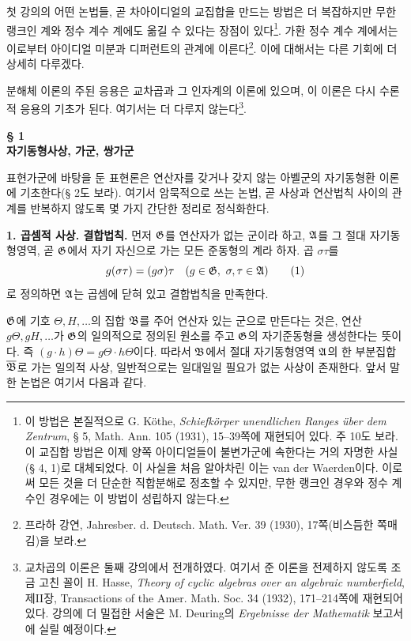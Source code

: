 첫 강의의 어떤 논법들, 곧 차아이디얼의 교집합을 만드는 방법은 더 복잡하지만 무한 랭크인 계와 정수 계수 계에도 옮길 수 있다는 장점이 있다\footnote{이 방법은 본질적으로 G. Köthe, \emph{Schiefkörper unendlichen Ranges über dem Zentrum}, § 5, Math. Ann. 105 (1931), 15--39쪽에 재현되어 있다. 주 10도 보라. 이 교집합 방법은 이제 양쪽 아이디얼들이 불변가군에 속한다는 거의 자명한 사실(§ 4, 1)로 대체되었다. 이 사실을 처음 알아차린 이는 van der Waerden이다. 이로써 모든 것을 더 단순한 직합분해로 정초할 수 있지만, 무한 랭크인 경우와 정수 계수인 경우에는 이 방법이 성립하지 않는다.}. 가환 정수 계수 계에서는 이로부터 아이디얼 미분과 디퍼런트의 관계에 이른다\footnote{프라하 강연, Jahresber. d. Deutsch. Math. Ver. 39 (1930), 17쪽(비스듬한 쪽매김)을 보라.}. 이에 대해서는 다른 기회에 더 상세히 다루겠다.

분해체 이론의 주된 응용은 교차곱과 그 인자계의 이론에 있으며, 이 이론은 다시 수론적 응용의 기초가 된다. 여기서는 더 다루지 않는다\footnote{교차곱의 이론은 둘째 강의에서 전개하였다. 여기서 준 이론을 전제하지 않도록 조금 고친 꼴이 H. Hasse, \emph{Theory of cyclic algebras over an algebraic numberfield}, 제II장, Transactions of the Amer. Math. Soc. 34 (1932), 171--214쪽에 재현되어 있다. 강의에 더 밀접한 서술은 M. Deuring의 \emph{Ergebnisse der Mathematik} 보고서에 실릴 예정이다.}.

\begin{center}
\textbf{§ 1}\\[0.4em]
\textbf{자기동형사상, 가군, 쌍가군}
\end{center}

표현가군에 바탕을 둔 표현론은 연산자를 갖거나 갖지 않는 아벨군의 자기동형환 이론에 기초한다(§ 2도 보라). 여기서 암묵적으로 쓰는 논법, 곧 사상과 연산법칙 사이의 관계를 반복하지 않도록 몇 가지 간단한 정리로 정식화한다.

\noindent\textbf{1. 곱셈적 사상. 결합법칙.} 먼저 \(\mathfrak G\)를 연산자가 없는 군이라 하고, \(\mathfrak A\)를 그 절대 자기동형영역, 곧 \(\mathfrak G\)에서 자기 자신으로 가는 모든 준동형의 계라 하자. 곱 \(\sigma\tau\)를
\[
g(\sigma\tau)=(g\sigma)\tau
\quad\text{(\(g\in\mathfrak G,\ \sigma,\tau\in\mathfrak A\))} \tag{1}
\]
로 정의하면 \(\mathfrak A\)는 곱셈에 닫혀 있고 결합법칙을 만족한다.

\(\mathfrak G\)에 기호 \(\Theta,H,\ldots\)의 집합 \(\mathfrak B\)를 주어 연산자 있는 군으로 만든다는 것은, 연산 \(g\Theta,gH,\ldots\)가 \(\mathfrak G\)의 일의적으로 정의된 원소를 주고 \(\mathfrak G\)의 자기준동형을 생성한다는 뜻이다. 즉 \((g\cdot h)\Theta=g\Theta\cdot h\Theta\)이다. 따라서 \(\mathfrak B\)에서 절대 자기동형영역 \(\mathfrak A\)의 한 부분집합 \(\overline{\mathfrak B}\)로 가는 일의적 사상, 일반적으로는 일대일일 필요가 없는 사상이 존재한다. 앞서 말한 논법은 여기서 다음과 같다.


